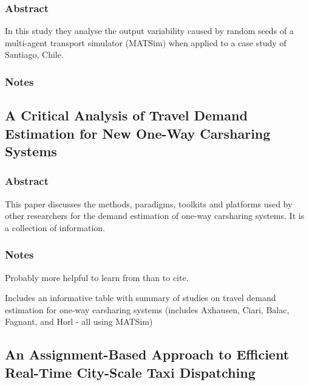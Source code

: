 \documentclass[]{article}
\begin{document}
\hypertarget{abstract-5}{%
\subsubsection{Abstract}\label{abstract-5}}

In this study they analyse the output variability caused by random seeds
of a multi-agent transport simulator (MATSim) when applied to a case
study of Santiago, Chile.

\hypertarget{notes-5}{%
\subsubsection{Notes}\label{notes-5}}

\hypertarget{a-critical-analysis-of-travel-demand-estimation-for-new-one-way-carsharing-systems}{%
\subsection{A Critical Analysis of Travel Demand Estimation for New
One-Way Carsharing
Systems}\label{a-critical-analysis-of-travel-demand-estimation-for-new-one-way-carsharing-systems}}

\hypertarget{abstract-6}{%
\subsubsection{Abstract}\label{abstract-6}}

This paper discusses the methods, paradigms, toolkits and platforms used
by other researchers for the demand estimation of one-way carsharing
systems. It is a collection of information.

\hypertarget{notes-6}{%
\subsubsection{Notes}\label{notes-6}}

Probably more helpful to learn from than to cite.

Includes an informative table with summary of studies on travel demand
estimation for one-way carsharing systems (includes Axhausen, Ciari,
Balac, Fagnant, and Horl - all using MATSim)

\hypertarget{an-assignment-based-approach-to-efficient-real-time-city-scale-taxi-dispatching}{%
\subsection{An Assignment-Based Approach to Efficient Real-Time
City-Scale Taxi
Dispatching}\label{an-assignment-based-approach-to-efficient-real-time-city-scale-taxi-dispatching}}
\end{document}
